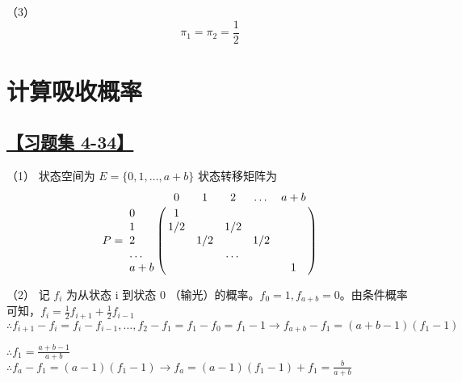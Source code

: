 （3）
$$
\pi_1=\pi_2=\frac{1}{2}
$$

\section{计算吸收概率}

\subsection{\hyperref[Q4-34]{【习题集 4-34】}}\label{A4-34}

（1）
状态空间为 $E=\{0, 1, \dots, a+b\}$
状态转移矩阵为
$$
P=\bordermatrix{
	~ & 0 & 1 & 2 & \dots & a+b \cr
	0 & 1 &   &   &  \cr
	1 & 1/2 &   & 1/2 &  \cr
	2 &   & 1/2 &  & 1/2 \cr
	\dots & & & \dots & \cr
	a+b &&&&& 1 \cr
}
$$

（2）
记 $f_i$ 为从状态 i 到状态 0 （输光）的概率。$f_0=1, f_{a+b}=0$。由条件概率可知，$f_i=\frac{1}{2}f_{i+1}+\frac{1}{2}f_{i-1}$
$\therefore f_{i+1}-f_i=f_i-f_{i-1}, \dots, f_2-f_1=f_1-f_0=f_1-1 \rightarrow f_{a+b}-f_1=(a+b-1)(f_1-1)$

\noindent
$\therefore f_1=\frac{a+b-1}{a+b}$
$\therefore f_a-f_1=(a-1)(f_1-1)\rightarrow f_a=(a-1)(f_1-1)+f_1=\frac{b}{a+b}$